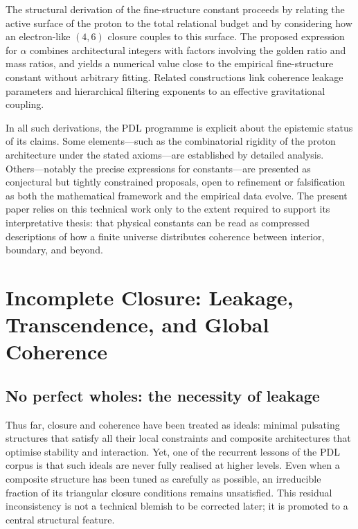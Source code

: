 \documentclass[11pt,a4paper]{article}
\theoremstyle{definition}
\begin{document}
The structural derivation of the fine-structure constant proceeds by relating the active surface of the proton to the total relational budget and by considering how an electron-like \((4,6)\) closure couples to this surface.\cite{Laubscher_Alpha_v2_2024,Laubscher_Born_Golden_v2_2024} The proposed expression for \(\alpha\) combines architectural integers with factors involving the golden ratio and mass ratios, and yields a numerical value close to the empirical fine-structure constant without arbitrary fitting. Related constructions link coherence leakage parameters and hierarchical filtering exponents to an effective gravitational coupling.\cite{Laubscher_Exponent18_v2_2024,Laubscher_UniversalCoherenceLeakage_2024}

In all such derivations, the PDL programme is explicit about the epistemic status of its claims. Some elements---such as the combinatorial rigidity of the proton architecture under the stated axioms---are established by detailed analysis.\cite{Laubscher_ProtonArch_v2_2024,Laubscher_PDL_GlobalMapping_v6_2024} Others---notably the precise expressions for constants---are presented as conjectural but tightly constrained proposals, open to refinement or falsification as both the mathematical framework and the empirical data evolve.\cite{Laubscher_Alpha_v2_2024,Laubscher_PDL_Position_2024} The present paper relies on this technical work only to the extent required to support its interpretative thesis: that physical constants can be read as compressed descriptions of how a finite universe distributes coherence between interior, boundary, and beyond.

\section{Incomplete Closure: Leakage, Transcendence, and Global Coherence}
\label{sec:leakage_transcendence}

\subsection{No perfect wholes: the necessity of leakage}

Thus far, closure and coherence have been treated as ideals: minimal pulsating structures that satisfy all their local constraints and composite architectures that optimise stability and interaction. Yet, one of the recurrent lessons of the PDL corpus is that such ideals are never fully realised at higher levels. Even when a composite structure has been tuned as carefully as possible, an irreducible fraction of its triangular closure conditions remains unsatisfied.\cite{Laubscher_Leakage_Probability_2024,Laubscher_Exponent18_v2_2024,Laubscher_PDL_Position_2024} This residual inconsistency is not a technical blemish to be corrected later; it is promoted to a central structural feature.
\end{document}
